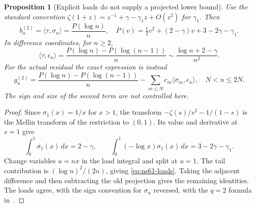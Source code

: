 \documentclass[11pt]{article}
\newtheorem{proposition}[theorem]{Proposition}
\theoremstyle{remark}
\begin{document}
\begin{proposition}[Explicit loads do not supply a projected lower bound]
\label{prop:ns61-loads}
Use the standard convention
$\zeta(1+z)=z^{-1}+\gamma-\gamma_1z+O(z^2)$ for $\gamma_1$.
Then
\begin{equation}
 b_n^{(2)}=\langle\tau,\sigma_n\rangle
 =\frac{P(\log n)}n,
 \quad P(v)=\tfrac12v^2+(2-\gamma)v+3-2\gamma-\gamma_1.
 \label{eq:ns61-loads}
\end{equation}
In difference coordinates, for $n\geq2$,
\[
 \langle\tau,\epsilon_n\rangle
 =\frac{P(\log n)-P(\log(n-1))}{n}
 \sim\frac{\log n+2-\gamma}{n^2}.
\]
For the actual residual the exact expression is instead
\begin{equation}
 g_n^{(2)}=\frac{P(\log n)-P(\log(n-1))}{n}
       -\sum_{m\leq N}c_m\langle\sigma_m,\epsilon_n\rangle,
 \quad N<n\leq2N.
 \label{eq:ns61-retained-cross}
\end{equation}
The sign and size of the second term are not controlled here.
\end{proposition}
\begin{proof}
Since $\sigma_1(x)=1/x$ for $x>1$, the transform
$-\zeta(s)/s^2-1/(1-s)$ is the Mellin transform of the restriction
to $(0,1)$. Its value and derivative at $s=1$ give
\[
 \int_0^1\sigma_1(x)\,dx=2-\gamma,\qquad
 \int_0^1(-\log x)\sigma_1(x)\,dx=3-2\gamma-\gamma_1.
\]
Change variables $u=nx$ in the load integral and split at $u=1$.
The tail contribution is $(\log n)^2/(2n)$, giving
\eqref{eq:ns61-loads}. Taking the adjacent difference and then
subtracting the old projection gives the remaining identities.
The loads agree, with the sign convention for $\sigma_n$ reversed,
with the $q=2$ formula in~\cite{Ehm2024}.
\end{proof}
\end{document}
